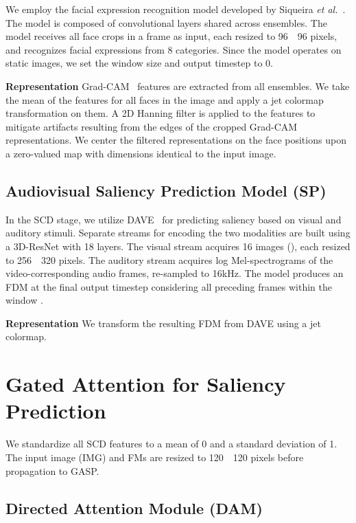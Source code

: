 \documentclass{article}
\begin{document}
We employ the facial expression recognition model developed by Siqueira \textit{et al.}~. The model is composed of convolutional layers shared across  ensembles.
The model receives all face crops in a frame as input, each resized to 96~~96 pixels, and recognizes facial expressions from 8 categories. Since the model operates on static images, we set the window size  and output timestep  to 0.

\textbf{Representation}
Grad-CAM~\cite{selvaraju2017grad} features are extracted from all  ensembles. We take the mean of the features for all faces in the image and apply a jet colormap transformation on them. A 2D Hanning filter is applied to the features to mitigate artifacts resulting from the edges of the cropped Grad-CAM representations. We center the filtered representations on the face positions upon a zero-valued map with dimensions identical to the input image.

\subsection{Audiovisual Saliency Prediction Model (SP)}

In the SCD stage, we utilize DAVE~\cite{tavakoli2020deep} for predicting saliency based on visual and auditory stimuli. Separate streams for encoding the two modalities are built using a 3D-ResNet with 18 layers. The visual stream acquires 16 images (), each resized to 256~~320 pixels. 
The auditory stream acquires log Mel-spectrograms of the video-corresponding audio frames, re-sampled to 16kHz. The model produces an FDM at the final output timestep  considering all preceding frames within the window .

\textbf{Representation}
We transform the resulting FDM from DAVE using a jet colormap.

\section{Gated Attention for Saliency Prediction}
\label{sec:stage2}

We standardize all SCD features to a mean of 0 and a standard deviation of 1. The input image (IMG) and FMs are resized to 120~~120 pixels before propagation to GASP. 

\subsection{Directed Attention Module (DAM)}
\end{document}
